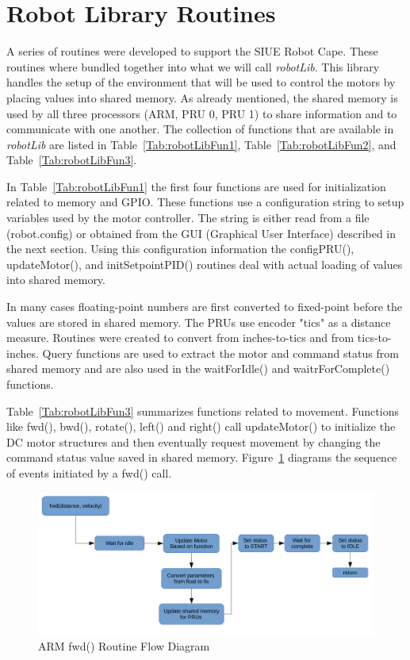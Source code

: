 \documentclass[12pt,oneside,final]{siuethesis}
\theoremstyle{definition}
\begin{document}
\section{Robot Library Routines}

A series of routines were developed to support the SIUE Robot Cape.  These routines where bundled together into what we will call \emph{robotLib}. This library handles the setup of the environment that will be used to control the motors by placing values into shared memory. As already mentioned, the shared memory is used by all three processors (ARM, PRU 0, PRU 1) to share information and to communicate with one another. The collection of functions that are available in \emph{robotLib} are listed in Table~\ref{Tab:robotLibFun1}, Table~\ref{Tab:robotLibFun2}, and Table~\ref{Tab:robotLibFun3}. 

In Table~\ref{Tab:robotLibFun1} the first four functions are used for initialization related to memory and GPIO. These functions use a configuration string to setup variables used by the motor controller. The string is either read from a file (robot.config) or obtained from the GUI (Graphical User Interface) described in the next section. Using this configuration information the configPRU(), updateMotor(), and initSetpointPID() routines deal with actual loading of values into shared memory.  

In many cases floating-point numbers are first converted to fixed-point before the values are stored in shared memory. The PRUs use encoder "tics" as a distance measure.  Routines were created to convert from inches-to-tics and from tics-to-inches. Query functions are used to extract the motor and command status from shared memory and are also used in the waitForIdle() and waitrForComplete() functions.

Table~\ref{Tab:robotLibFun3} summarizes functions related to movement. Functions like fwd(), bwd(), rotate(), left() and right() call updateMotor() to initialize the DC motor structures and then eventually request movement by changing the command status value saved in shared memory.  Figure~\ref{fig:ARMFlow} diagrams the sequence of events initiated by a fwd() call. 

\begin{figure}
	\centering
	\includegraphics[scale=.4]{./images/ArmFlow.png}
	\caption{ARM fwd() Routine Flow Diagram}
	\label{fig:ARMFlow}
\end{figure}
\end{document}
